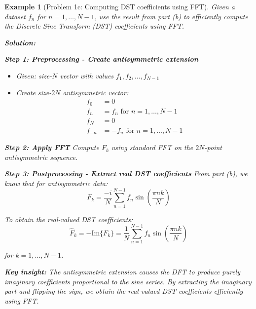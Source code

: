 \documentclass[11pt,a4paper]{article}
\newtheorem{example}[theorem]{Example}
\begin{document}
\begin{example}[Problem 1c: Computing DST coefficients using FFT]
    Given a dataset $f_n$ for $n = 1, \ldots, N-1$, use the result from part (b) to efficiently compute the Discrete Sine Transform (DST) coefficients using FFT.
    
    \textbf{Solution:}
    
    \textbf{Step 1: Preprocessing - Create antisymmetric extension}
    \begin{itemize}
        \item Given: size-$N$ vector with values $f_1, f_2, \ldots, f_{N-1}$
        \item Create size-$2N$ antisymmetric vector:
        \begin{align}
            f_0 &= 0\\
            f_n &= f_n \text{ for } n = 1, \ldots, N-1\\
            f_N &= 0\\
            f_{-n} &= -f_n \text{ for } n = 1, \ldots, N-1
        \end{align}
    \end{itemize}
    
    \textbf{Step 2: Apply FFT}
    Compute $F_k$ using standard FFT on the $2N$-point antisymmetric sequence.
    
    \textbf{Step 3: Postprocessing - Extract real DST coefficients}
    From part (b), we know that for antisymmetric data:
    $$F_k = \frac{-i}{N} \sum_{n=1}^{N-1} f_n \sin\left(\frac{\pi nk}{N}\right)$$
    
    To obtain the real-valued DST coefficients:
    $$\hat{F}_k = -\text{Im}\{F_k\} = \frac{1}{N} \sum_{n=1}^{N-1} f_n \sin\left(\frac{\pi nk}{N}\right)$$
    
    for $k = 1, \ldots, N-1$.
    
    \textbf{Key insight:} The antisymmetric extension causes the DFT to produce purely imaginary coefficients proportional to the sine series. By extracting the imaginary part and flipping the sign, we obtain the real-valued DST coefficients efficiently using FFT.
\end{example}
\end{document}
